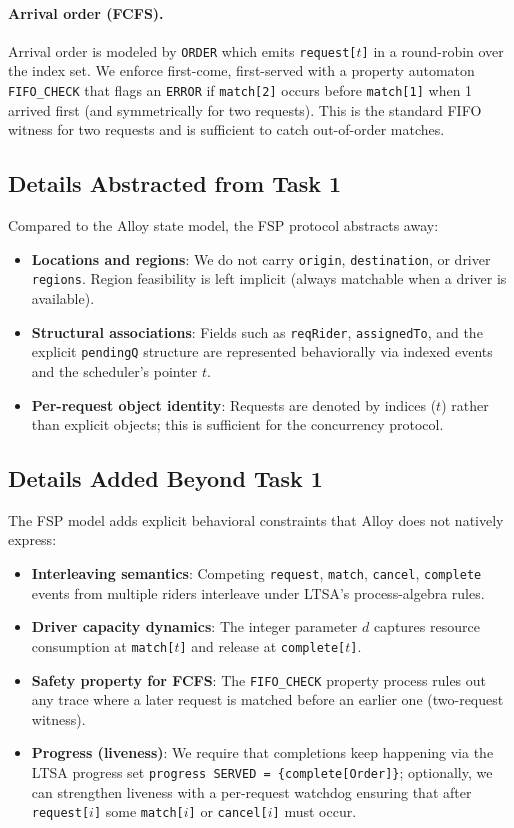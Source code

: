 \documentclass[11pt]{article}
\begin{document}
\paragraph{Arrival order (FCFS).}
Arrival order is modeled by \texttt{ORDER} which emits \texttt{request[$t$]} in a round-robin over the index set.
We enforce first-come, first-served with a property automaton \texttt{FIFO\_CHECK} that flags an \texttt{ERROR}
if \texttt{match[2]} occurs before \texttt{match[1]} when 1 arrived first (and symmetrically for two requests).
This is the standard FIFO witness for two requests and is sufficient to catch out-of-order matches.

\subsection{Details Abstracted from Task 1}

Compared to the Alloy state model, the FSP protocol abstracts away:
\begin{itemize}[leftmargin=1.5em]
  \item \textbf{Locations and regions}: We do not carry \texttt{origin}, \texttt{destination}, or driver \texttt{regions}. Region feasibility is left implicit (always matchable when a driver is available).
  \item \textbf{Structural associations}: Fields such as \texttt{reqRider}, \texttt{assignedTo}, and the explicit \texttt{pendingQ} structure are represented behaviorally via indexed events and the scheduler’s pointer $t$.
  \item \textbf{Per-request object identity}: Requests are denoted by indices ($t$) rather than explicit objects; this is sufficient for the concurrency protocol.
\end{itemize}

\subsection{Details Added Beyond Task 1}

The FSP model adds explicit behavioral constraints that Alloy does not natively express:
\begin{itemize}[leftmargin=1.5em]
  \item \textbf{Interleaving semantics}: Competing \texttt{request}, \texttt{match}, \texttt{cancel}, \texttt{complete} events from multiple riders interleave under LTSA’s process-algebra rules.
  \item \textbf{Driver capacity dynamics}: The integer parameter $d$ captures resource consumption at \texttt{match[$t$]} and release at \texttt{complete[$t$]}.
  \item \textbf{Safety property for FCFS}: The \texttt{FIFO\_CHECK} property process rules out any trace where a later request is matched before an earlier one (two-request witness).
  \item \textbf{Progress (liveness)}: We require that completions keep happening via the LTSA progress set \texttt{progress SERVED = \{complete[Order]\}}; optionally, we can strengthen liveness with a per-request watchdog ensuring that after \texttt{request[$i$]} some \texttt{match[$i$]} or \texttt{cancel[$i$]} must occur.
\end{itemize}
\end{document}
